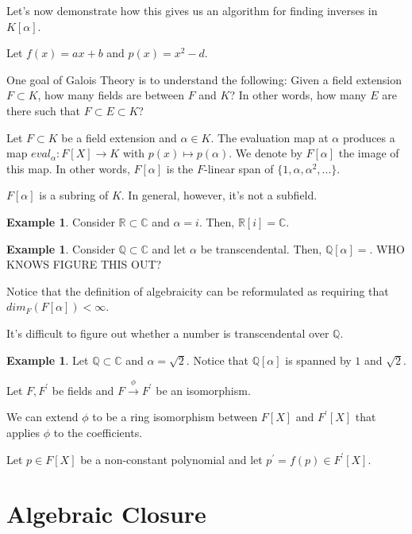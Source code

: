 \documentclass{article}
\theoremstyle{definition}
\newtheorem{example}[theorem]{Example}
\newcommand{\R}{\mathbb{R}}
\newcommand{\Q}{\mathbb{Q}}
\newcommand{\C}{\mathbb{C}}
\begin{document}
Let's now demonstrate how this gives us an algorithm for finding inverses in $K[\alpha]$.

Let $f(x) = ax + b$ and $p(x) = x^{2} - d$.

One goal of Galois Theory is to understand the following: Given a field extension $F \subset K$,
how many fields are between $F$ and $K$? In other words, how many $E$ are there such that
$F \subset E \subset K$?

Let $F \subset K$ be a field extension and $\alpha \in K$. The evaluation map at $\alpha$
produces a map $eval_{\alpha}: F[X] \xrightarrow{} K$ with $p(x) \mapsto p(\alpha)$.
We denote by $F[\alpha]$ the image of this map.
In other words, $F[\alpha]$ is the $F$-linear span of $\{1,\alpha, \alpha^{2},...\}$.

$F[\alpha]$ is a subring of $K$. In general, however, it's not a subfield.

\begin{example}
    Consider $\R \subset \C$ and $\alpha = i$. Then, $\R[i] = \C$.
\end{example}

\begin{example}
    Consider $\Q \subset \C$ and let $\alpha$ be transcendental. Then, $\Q[\alpha] = $. WHO KNOWS FIGURE THIS OUT?
\end{example}

Notice that the definition of algebraicity can be reformulated as requiring that $dim_{F}(F[\alpha]) < \infty$.

It's difficult to figure out whether a number is transcendental over $\Q$.

\begin{example}
    Let $\Q \subset \C$ and $\alpha = \sqrt{2}$. Notice that $\Q[\alpha]$ is spanned by $1$ and $\sqrt{2}$. 
\end{example}


Let $F,F^{\prime}$ be fields and $F \xrightarrow{\phi} F^{\prime}$ be an isomorphism.

We can extend $\phi$ to be a ring isomorphism between $F[X]$ and $F^{\prime}[X]$ that applies
$\phi$ to the coefficients.

Let $p \in F[X]$ be a non-constant polynomial and let $p^{\prime} = f(p) \in F^{\prime}[X]$.

\newpage

\section{Algebraic Closure}
\end{document}
